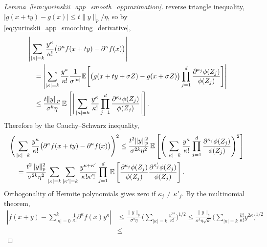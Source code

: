 \begin{proof}[Lemma~\ref{lem:yurinskii_app_smooth_approximation}]
  reverse triangle inequality, $|g(x + t y) - g(x)| \leq t \|y\|_p / \eta$,
  so by \eqref{eq:yurinskii_app_smoothing_derivative},
  \begin{align*}
    &\left|
    \sum_{|\kappa|=k}
    \frac{y^\kappa}{\kappa!}
    \big(
      \partial^{\kappa} f(x + t y)
      - \partial^{\kappa} f(x)
    \big)
    \right| \\
    &\quad=
    \left|
    \sum_{|\kappa|=k}
    \frac{y^\kappa}{\kappa!}
    \frac{1}{\sigma^{|\kappa|}}
    \mathbb{E} \Bigg[
      \big(
        g(x + t y + \sigma Z)
        - g(x + \sigma Z)
      \big)
      \prod_{j=1}^{d}
      \frac{\partial^{\kappa_j}\phi(Z_j)}{\phi(Z_j)}
    \Bigg]
    \right| \\
    &\quad\leq
    \frac{t \|y\|_p}{\sigma^k \eta}
    \, \mathbb{E} \left[
      \Bigg|
      \sum_{|\kappa|=k}
      \frac{y^\kappa}{\kappa!}
      \prod_{j=1}^{d}
      \frac{\partial^{\kappa_j}\phi(Z_j)}{\phi(Z_j)}
      \Bigg|
    \right].
  \end{align*}
  Therefore by the Cauchy--Schwarz inequality,
  \begin{align*}
    &\Bigg(
      \sum_{|\kappa|=k}
      \frac{y^\kappa}{\kappa!}
      \big(
        \partial^{\kappa} f(x + t y)
        - \partial^{\kappa} f(x)
      \big)
    \Bigg)^2
    \leq
    \frac{t^2 \|y\|_p^2}{\sigma^{2k} \eta^2}
    \, \mathbb{E} \left[
      \Bigg(
        \sum_{|\kappa|=k}
        \frac{y^\kappa}{\kappa!}
        \prod_{j=1}^{d}
        \frac{\partial^{\kappa_j} \phi(Z_j)}{\phi(Z_j)}
      \Bigg)^2
    \right] \\
    &\quad=
    \frac{t^2 \|y\|_p^2}{\sigma^{2k} \eta^2}
    \sum_{|\kappa|=k}
    \sum_{|\kappa'|=k}
    \frac{y^{\kappa + \kappa'}}{\kappa! \kappa'!}
    \prod_{j=1}^{d}
    \, \mathbb{E} \left[
      \frac{\partial^{\kappa_j} \phi(Z_j)}{\phi(Z_j)}
      \frac{\partial^{\kappa'_j} \phi(Z_j)}{\phi(Z_j)}
    \right].
  \end{align*}
  Orthogonality of Hermite polynomials gives zero if
  $\kappa_j \neq \kappa'_j$. By the multinomial theorem,
  \begin{align*}
    \left|
    f(x + y)
    - \sum_{|\kappa|=0}^{k}
    \frac{1}{\kappa!}
    \partial^{\kappa} f(x)
    y^\kappa
    \right|
    &\leq
    \frac{\|y\|_p}{\sigma^k \eta}
    \Bigg(
      \sum_{|\kappa|=k}
      \frac{y^{2 \kappa}}{\kappa!}
    \Bigg)^{1/2}
    \leq
    \frac{\|y\|_p}{\sigma^k \eta \sqrt{k!}}
    \Bigg(
      \sum_{|\kappa|=k}
      \frac{k!}{\kappa!}
      y^{2 \kappa}
    \Bigg)^{1/2} \\
    &\leq

\end{align*}
\end{proof}
